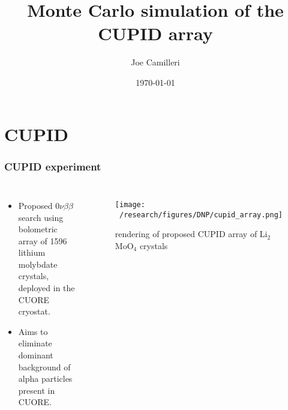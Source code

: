 \documentclass{beamer}
\title[CUPID array]{Monte Carlo simulation of the CUPID array} %
\author{Joe Camilleri} %
\institute[Virginia Tech] %
{
	DNP October 2021 \\ %
	\medskip
	\textit{jcamilleri@vt.edu} %
}
\date{\today} %
\begin{document}
	
%	
%	
	
	\section{CUPID}
	\begin{frame}
		\frametitle{CUPID experiment}
		\begin{columns}[c] %
			
			\begin{itemize}
				\item Proposed $0\nu\beta\beta$ search using bolometric array of 1596 lithium molybdate crystals, deployed in the CUORE cryostat.
				\item Aims to eliminate dominant background of alpha particles present in CUORE.
			\end{itemize}
			
			\begin{figure}
			\texttt{[image: ~/research/figures/DNP/cupid\_array.png]}
			\caption{rendering of proposed CUPID array of Li$_2$MoO$_4$ crystals}
			\end{figure}
			
		\end{columns}
	\end{frame}
	
\end{document}
